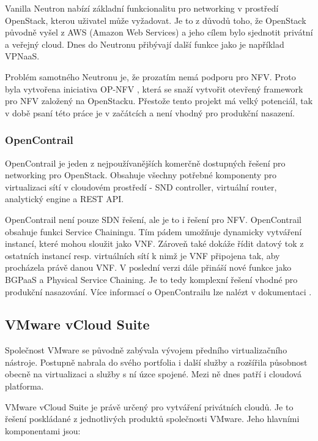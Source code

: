 Vanilla Neutron nabízí základní funkcionalitu pro networking v prostředí OpenStack, kterou uživatel může vyžadovat. Je to z důvodů toho, že OpenStack původně vyšel z AWS (Amazon Web Services) a jeho cílem bylo sjednotit privátní a veřejný cloud. Dnes do Neutronu přibývají další funkce jako je například VPNaaS.

Problém samotného Neutronu je, že prozatím nemá podporu pro NFV. Proto byla vytvořena iniciativa OP-NFV \cite{opnfv} , která se snaží vytvořit otevřený framework pro NFV založený na OpenStacku. Přestože tento projekt má velký potenciál, tak v době psaní této práce je v začátcích a není vhodný pro produkční nasazení.

\subsubsection{OpenContrail} 

OpenContrail je jeden z nejpoužívanějších komerčně dostupných řešení pro networking pro OpenStack. Obsahuje všechny potřebné komponenty pro virtualizaci sítí v cloudovém prostředí - SND controller, virtuální router, analytický engine a REST API. \cite{OpenContrail}

OpenContrail není pouze SDN řešení, ale je to i řešení pro NFV. OpenContrail obsahuje funkci Service Chainingu. Tím pádem umožňuje dynamicky vytváření instancí, které mohou sloužit jako VNF. Zároveň také dokáže řídit datový tok z ostatních instancí resp. virtuálních sítí k nimž je VNF připojena tak, aby procházela právě danou VNF. V poslední verzi dále přináší nové funkce jako BGPaaS a Physical Service Chaining. Je to tedy komplexní řešení vhodné pro produkční nasazování. Více informací o OpenContrailu lze nalézt v dokumentaci \cite{opencontrail_web}.

\subsection{VMware vCloud Suite}

Společnost VMware \cite{vmware_web} se původně zabývala vývojem předního virtualizačního nástroje. Postupně nabrala do svého portfolia i další služby a rozšířila působnost obecně na virtualizaci a služby s ní úzce spojené. Mezi ně dnes patří i cloudová platforma. 

VMware vCloud Suite je právě určený pro vytváření privátních cloudů. Je to řešení poskládané z jednotlivých produktů společnosti VMware. Jeho hlavními komponentami jsou:

